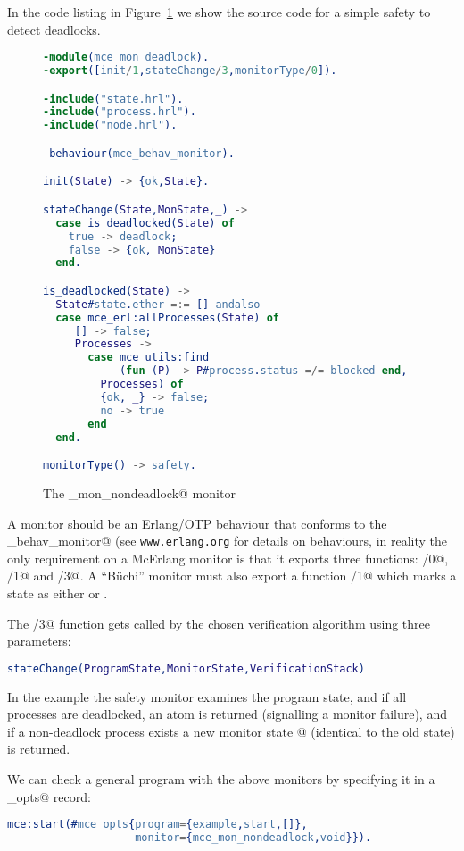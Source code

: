 \documentclass[a4paper]{article}
\begin{document}
In the code listing in Figure~\ref{mce_mon_nondeadlock}
we show the source code for
a simple safety to detect deadlocks.
\begin{figure}
\begin{lstlisting}[language=Erlang]
-module(mce_mon_deadlock).
-export([init/1,stateChange/3,monitorType/0]).

-include("state.hrl").
-include("process.hrl").
-include("node.hrl").

-behaviour(mce_behav_monitor).

init(State) -> {ok,State}.

stateChange(State,MonState,_) -> 
  case is_deadlocked(State) of
    true -> deadlock;
    false -> {ok, MonState}
  end.

is_deadlocked(State) ->
  State#state.ether =:= [] andalso
  case mce_erl:allProcesses(State) of
     [] -> false;
     Processes ->
       case mce_utils:find
            (fun (P) -> P#process.status =/= blocked end,
	     Processes) of
         {ok, _} -> false;
         no -> true
       end
  end.

monitorType() -> safety.
\end{lstlisting}
\caption{The \lstinline@mce_mon_nondeadlock@ monitor}
\label{mce_mon_nondeadlock}
\end{figure}
A monitor should be an Erlang/OTP behaviour that conforms
to the \lstinline@mce_behav_monitor@ (see \texttt{www.erlang.org}
for details on behaviours, in reality the only requirement on a McErlang
monitor is that it exports
three functions: \lstinline@monitorType/0@,
\lstinline@init/1@ and \lstinline@stateChange/3@.
A ``B\"uchi'' monitor must also export a function
\lstinline@stateType/1@ which marks a state
as either \lstinline@accepting@ or
\lstinline@nonaccepting@.

The \lstinline@stateChange/3@ function
gets called by the chosen verification
algorithm using three parameters:
\begin{lstlisting}[language=Erlang]
stateChange(ProgramState,MonitorState,VerificationStack)
\end{lstlisting}
In the example the safety monitor examines
the program state, and if all processes are
deadlocked, an atom \lstinline@deadlock@
is returned (signalling a monitor failure),
and if a non-deadlock process exists
a new monitor state @
(identical to the old state)
is returned.

We can check a general program with the above monitors by specifying
it in a \lstinline@mce_opts@ record:
\begin{lstlisting}[language=Erlang]
mce:start(#mce_opts{program={example,start,[]},
                    monitor={mce_mon_nondeadlock,void}}).
\end{lstlisting}
\end{document}
